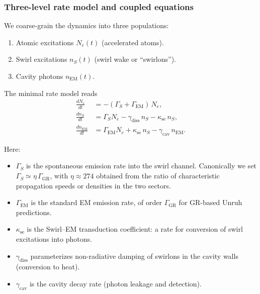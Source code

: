     \subsubsection{Three-level rate model and coupled equations}
        \label{subsubsec:three_level_model}

        We coarse-grain the dynamics into three populations:

        \begin{enumerate}
            \item Atomic excitations $N_e(t)$ (accelerated atoms).
            \item Swirl excitations $n_S(t)$ (swirl wake or ``swirlons'').
            \item Cavity photons $n_{\mathrm{EM}}(t)$.
        \end{enumerate}

        The minimal rate model reads
        \begin{subequations}
            \label{eq:rate_system_full}
            \begin{align}
                \frac{d N_e}{dt}
                &=
                -(\Gamma_S + \Gamma_{\mathrm{EM}})\,N_e,
                \label{eq:dNe_dt}
                \\
                \frac{d n_S}{dt}
                &=
                \Gamma_S N_e
                - \gamma_{\mathrm{diss}}\, n_S
                - \kappa_{\text{se}}\, n_S,
                \label{eq:dnS_dt}
                \\
                \frac{d n_{\mathrm{EM}}}{dt}
                &=
                \Gamma_{\mathrm{EM}} N_e
                + \kappa_{\text{se}}\, n_S
                - \gamma_{\mathrm{cav}}\, n_{\mathrm{EM}}.
                \label{eq:dnEM_dt}
            \end{align}
        \end{subequations}

        Here:

        \begin{itemize}
            \item $\Gamma_S$ is the spontaneous emission rate into the swirl channel.
            Canonically we set $\Gamma_S \simeq \eta \,\Gamma_{\mathrm{GR}}$,
            with $\eta \approx 274$ obtained from the ratio of characteristic
            propagation speeds or densities in the two sectors.
            \item $\Gamma_{\mathrm{EM}}$ is the standard EM emission rate, of order
            $\Gamma_{\mathrm{GR}}$ for GR-based Unruh predictions.
            \item $\kappa_{\text{se}}$ is the Swirl--EM transduction coefficient: a rate for
            conversion of swirl excitations into photons.
            \item $\gamma_{\mathrm{diss}}$ parameterizes non-radiative damping of
            swirlons in the cavity walls (conversion to heat).
            \item $\gamma_{\mathrm{cav}}$ is the cavity decay rate (photon leakage and
            detection).
        \end{itemize}

